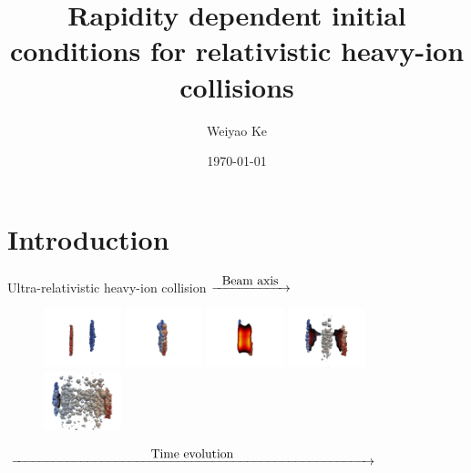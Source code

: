 \documentclass[11pt]{beamer}
\author{Weiyao Ke}
\title[Rapidity dependent IC for RHIC]{Rapidity dependent initial conditions for relativistic heavy-ion collisions}
\date{\today}
\begin{document}
\begin{frame}
\titlepage
\end{frame}


\begin{frame}[noframenumbering]
\tableofcontents
\end{frame}


\section{Introduction}
\begin{frame}{Ultra-relativistic heavy-ion collision}
$\xrightarrow{\makebox[2cm]{Beam axis}}$
    \begin{figure}
   	\begin{center}
	\includegraphics[width=0.2\textwidth]{pics/new1.png} 
	\includegraphics[width=0.2\textwidth]{pics/new50.png} 
	\includegraphics[width=0.2\textwidth]{pics/new100.png}	
	\includegraphics[width=0.2\textwidth]{pics/new230.png}  
	\includegraphics[width=0.2\textwidth]{pics/new300.png}  
	\end{center} 	
  	\end{figure}
  	\begin{center}
  	$\xrightarrow{\makebox[10cm]{Time evolution}}$
  	\end{center}


\end{frame}
\end{document}
